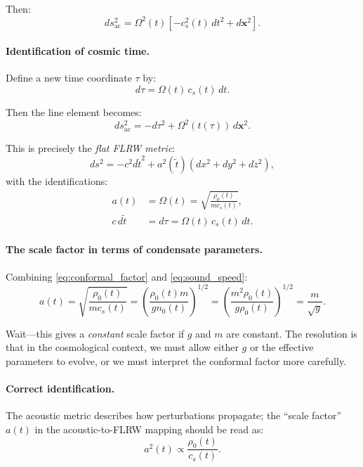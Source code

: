 Then:
\begin{equation}
\label{eq:acoustic_conformal}
ds_{\mathrm{ac}}^2 = \Omega^2(t) \left[ -c_s^2(t) \, dt^2 + d\mathbf{x}^2 \right].
\end{equation}

\paragraph{Identification of cosmic time.}
Define a new time coordinate $\tau$ by:
\begin{equation}
\label{eq:cosmic_time_def}
d\tau = \Omega(t) \, c_s(t) \, dt.
\end{equation}

Then the line element becomes:
\begin{equation}
\label{eq:acoustic_FLRW_form}
ds_{\mathrm{ac}}^2 = -d\tau^2 + \Omega^2(t(\tau)) \, d\mathbf{x}^2.
\end{equation}

This is precisely the \emph{flat FLRW metric}:
\begin{equation}
\label{eq:FLRW}
\boxed{ds^2 = -c^2 d\tilde{t}^2 + a^2(\tilde{t}) \left( dx^2 + dy^2 + dz^2 \right),}
\end{equation}
with the identifications:
\begin{align}
\label{eq:scale_factor_id}
a(t) &= \Omega(t) = \sqrt{\frac{\rho_0(t)}{m c_s(t)}}, \\
\label{eq:time_id}
c \, d\tilde{t} &= d\tau = \Omega(t) \, c_s(t) \, dt.
\end{align}

\paragraph{The scale factor in terms of condensate parameters.}
Combining \eqref{eq:conformal_factor} and \eqref{eq:sound_speed}:
\begin{equation}
\label{eq:scale_factor_explicit}
\boxed{a(t) = \sqrt{\frac{\rho_0(t)}{m c_s(t)}} = \left( \frac{\rho_0(t) m}{g n_0(t)} \right)^{1/2} = \left( \frac{m^2 \rho_0(t)}{g \rho_0(t)} \right)^{1/2} = \frac{m}{\sqrt{g}}.}
\end{equation}

Wait---this gives a \emph{constant} scale factor if $g$ and $m$ are constant. The resolution is that in the cosmological context, we must allow either $g$ or the effective parameters to evolve, or we must interpret the conformal factor more carefully.

\paragraph{Correct identification.}
The acoustic metric describes how perturbations propagate; the ``scale factor'' $a(t)$ in the acoustic-to-FLRW mapping should be read as:
\begin{equation}
\label{eq:scale_factor_correct}
a^2(t) \propto \frac{\rho_0(t)}{c_s(t)}.
\end{equation}

